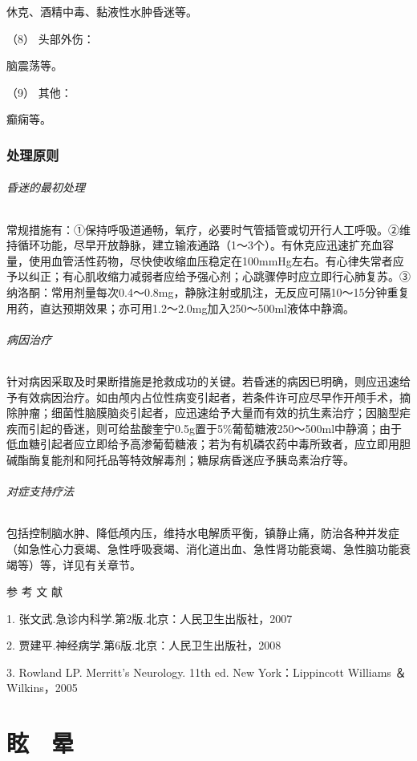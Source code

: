 休克、酒精中毒、黏液性水肿昏迷等。

\hypertarget{text00010.htmlux5cux23CHP1-2-2-4-2-3-8}{}
（8） 头部外伤：

脑震荡等。

\hypertarget{text00010.htmlux5cux23CHP1-2-2-4-2-3-9}{}
（9） 其他：

癫痫等。

\subsection{处理原则}

\subparagraph{昏迷的最初处理}

常规措施有：①保持呼吸道通畅，氧疗，必要时气管插管或切开行人工呼吸。②维持循环功能，尽早开放静脉，建立输液通路（1～3个）。有休克应迅速扩充血容量，使用血管活性药物，尽快使收缩血压稳定在100mmHg左右。有心律失常者应予以纠正；有心肌收缩力减弱者应给予强心剂；心跳骤停时应立即行心肺复苏。③纳洛酮：常用剂量每次0.4～0.8mg，静脉注射或肌注，无反应可隔10～15分钟重复用药，直达预期效果；亦可用1.2～2.0mg加入250～500ml液体中静滴。

\subparagraph{病因治疗}

针对病因采取及时果断措施是抢救成功的关键。若昏迷的病因已明确，则应迅速给予有效病因治疗。如由颅内占位性病变引起者，若条件许可应尽早作开颅手术，摘除肿瘤；细菌性脑膜脑炎引起者，应迅速给予大量而有效的抗生素治疗；因脑型疟疾而引起的昏迷，则可给盐酸奎宁0.5g置于5\%葡萄糖液250～500ml中静滴；由于低血糖引起者应立即给予高渗葡萄糖液；若为有机磷农药中毒所致者，应立即用胆碱酯酶复能剂和阿托品等特效解毒剂；糖尿病昏迷应予胰岛素治疗等。

\subparagraph{对症支持疗法}

包括控制脑水肿、降低颅内压，维持水电解质平衡，镇静止痛，防治各种并发症（如急性心力衰竭、急性呼吸衰竭、消化道出血、急性肾功能衰竭、急性脑功能衰竭等）等，详见有关章节。

\protect\hypertarget{text00011.html}{}{}

\hypertarget{text00011.htmlux5cux23CHP1-2-4}{}
参 考 文 献

1. 张文武.急诊内科学.第2版.北京：人民卫生出版社，2007

2. 贾建平.神经病学.第6版.北京：人民卫生出版社，2008

3. Rowland LP. Merritt's Neurology. 11th ed. New York：Lippincott
Williams ＆ Wilkins，2005

\protect\hypertarget{text00012.html}{}{}

\chapter{眩　晕}

